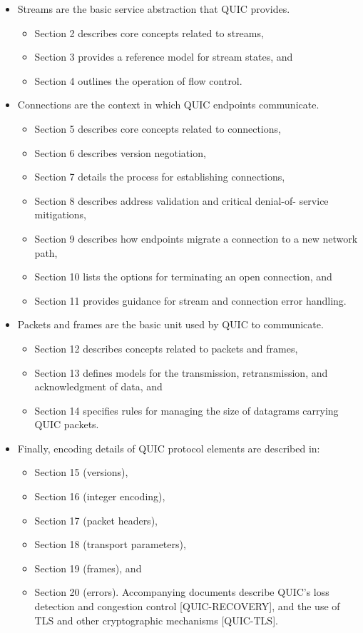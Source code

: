 \documentclass{article}
\begin{document}
\begin{itemize}
\item Streams are the basic service abstraction that QUIC provides.
\begin{itemize}
\item Section 2 describes core concepts related to streams,
\item Section 3 provides a reference model for stream states, and
\item Section 4 outlines the operation of flow control.
\end{itemize}
\item Connections are the context in which QUIC endpoints communicate.
\begin{itemize}
\item Section 5 describes core concepts related to connections,
\item Section 6 describes version negotiation,
\item Section 7 details the process for establishing connections,
\item Section 8 describes address validation and critical denial-of- service mitigations,
\item Section 9 describes how endpoints migrate a connection to a new network path,
\item Section 10 lists the options for terminating an open connection, and
\item Section 11 provides guidance for stream and connection error handling.
\end{itemize}
\item Packets and frames are the basic unit used by QUIC to communicate.
\begin{itemize}
\item Section 12 describes concepts related to packets and frames,
\item Section 13 defines models for the transmission, retransmission, and acknowledgment of data, and
\item Section 14 specifies rules for managing the size of datagrams carrying QUIC packets.
\end{itemize}
\item Finally, encoding details of QUIC protocol elements are described in:
\begin{itemize}
\item Section 15 (versions),
\item Section 16 (integer encoding),
\item Section 17 (packet headers),
\item Section 18 (transport parameters),
\item Section 19 (frames), and
\item Section 20 (errors).
Accompanying documents describe QUIC's loss detection and congestion control [QUIC-RECOVERY], and the use of TLS and other cryptographic mechanisms [QUIC-TLS].


\end{itemize}
\end{itemize}
\end{document}
